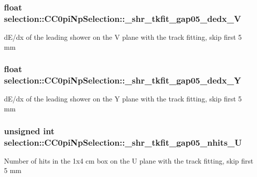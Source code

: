 \subsubsection[{\texorpdfstring{\+\_\+shr\+\_\+tkfit\+\_\+gap05\+\_\+dedx\+\_\+V}{_shr_tkfit_gap05_dedx_V}}]{\setlength{\rightskip}{0pt plus 5cm}float selection\+::\+C\+C0pi\+Np\+Selection\+::\+\_\+shr\+\_\+tkfit\+\_\+gap05\+\_\+dedx\+\_\+V\hspace{0.3cm}{\ttfamily [private]}}\hypertarget{classselection_1_1CC0piNpSelection_a711b325a6f6cb77db530eb21e1c99fc0}{}\label{classselection_1_1CC0piNpSelection_a711b325a6f6cb77db530eb21e1c99fc0}
d\+E/dx of the leading shower on the V plane with the track fitting, skip first 5 mm 
\subsubsection[{\texorpdfstring{\+\_\+shr\+\_\+tkfit\+\_\+gap05\+\_\+dedx\+\_\+Y}{_shr_tkfit_gap05_dedx_Y}}]{\setlength{\rightskip}{0pt plus 5cm}float selection\+::\+C\+C0pi\+Np\+Selection\+::\+\_\+shr\+\_\+tkfit\+\_\+gap05\+\_\+dedx\+\_\+Y\hspace{0.3cm}{\ttfamily [private]}}\hypertarget{classselection_1_1CC0piNpSelection_a82a0f0efca7cceee176b7058001073a6}{}\label{classselection_1_1CC0piNpSelection_a82a0f0efca7cceee176b7058001073a6}
d\+E/dx of the leading shower on the Y plane with the track fitting, skip first 5 mm 
\subsubsection[{\texorpdfstring{\+\_\+shr\+\_\+tkfit\+\_\+gap05\+\_\+nhits\+\_\+U}{_shr_tkfit_gap05_nhits_U}}]{\setlength{\rightskip}{0pt plus 5cm}unsigned int selection\+::\+C\+C0pi\+Np\+Selection\+::\+\_\+shr\+\_\+tkfit\+\_\+gap05\+\_\+nhits\+\_\+U\hspace{0.3cm}{\ttfamily [private]}}\hypertarget{classselection_1_1CC0piNpSelection_a06b5781f09cf3c5129efad982fa3c210}{}\label{classselection_1_1CC0piNpSelection_a06b5781f09cf3c5129efad982fa3c210}
Number of hits in the 1x4 cm box on the U plane with the track fitting, skip first 5 mm 
